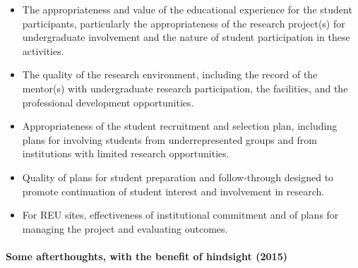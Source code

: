 \begin{itemize}
\item The appropriateness and value of the educational experience for the
  student participants, particularly the appropriateness of the
  research project(s) for undergraduate involvement and the nature of
  student participation in these activities.
\item The quality of the research environment, including the record of the
  mentor(s) with undergraduate research participation, the facilities,
  and the professional development opportunities.
\item Appropriateness of the student recruitment and selection plan,
  including plans for involving students from underrepresented groups
  and from institutions with limited research opportunities.
\item Quality of plans for student preparation and follow-through designed
  to promote continuation of student interest and involvement in
  research.
\item For REU sites, effectiveness of institutional commitment and of plans
  for managing the project and evaluating outcomes.
\end{itemize}

\paragraph{Some afterthoughts, with the benefit of hindsight (2015)} \quad \\


